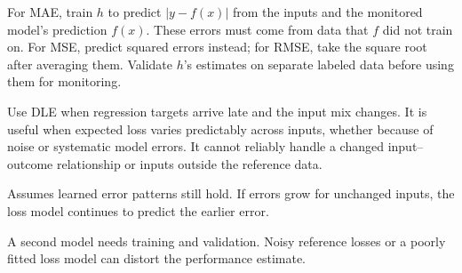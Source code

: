 \begin{metricformula}
\end{metricformula}

For MAE, train $h$ to predict $|y-f(x)|$ from the inputs and the monitored model's prediction $f(x)$. These errors must come from
data that $f$ did not train on. For MSE, predict squared errors instead; for RMSE, take the square root after averaging them.
Validate $h$'s estimates on separate labeled data before using them for monitoring.


Use DLE when regression targets arrive late and the input mix changes. It is useful when expected loss varies predictably across
inputs, whether because of noise or systematic model errors. It cannot reliably handle a changed input--outcome relationship
or inputs outside the reference data.


{
\item Assumes learned error patterns still hold. If errors grow for unchanged inputs, the loss model continues to predict the earlier error.
\item A second model needs training and validation. Noisy reference losses or a poorly fitted loss model can distort the performance estimate.
}

